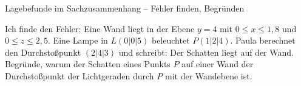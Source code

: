 \begin{aufgabe}{Lagebefunde im Sachzusammenhang – Fehler finden, Begründen}
\begin{teile}
\teil Ich finde den Fehler: Eine Wand liegt in der Ebene $y = 4$ mit $0 \le x \le 1{,}8$ und $0 \le z \le 2{,}5$. Eine Lampe in $L(0 | 0 | 5)$ beleuchtet $P(1 | 2 | 4)$. Paula berechnet den Durchstoßpunkt $(2 | 4 | 3)$ und schreibt: Der Schatten liegt auf der Wand.
\teil Begründe, warum der Schatten eines Punkts $P$ auf einer Wand der Durchstoßpunkt der Lichtgeraden durch $P$ mit der Wandebene ist.
\end{teile}
\end{aufgabe}
